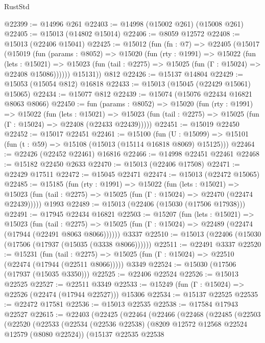 \begin{lexlean}{RustStd}
\begin{coremodule}
@22399 := @14996 @261
@22403 := @14998 (@15002 @261) (@15008 @261)
@22405 := @15013 (@14802 @15014)
@22406 := @8059 @12572
@22408 := @15013 (@22406 @15041)
@22425 := @15012
    (fun (fn : @7) =>
    @22405
      (@15017
        (@15019
          (fun (params : @8052) =>
          @15020
            (fun (rty : @1991) =>
            @15022
              (fun (lets : @15021) =>
              @15023 (fun (tail : @2275) => @15025 (fun (Γ : @15024) => @22408 @15086))))))
        @15131))
    @812
@22426 := @15137 @14804
@22429 := @15053 (@15054 @812) @16818
@22433 := @15013 (@15045 (@22429 @15061) @15065)
@22434 := @15077 @812
@22439 := @15074 (@15076 @22434 @16821 @8063 @8066)
@22450 := fun (params : @8052) =>
  @15020
    (fun (rty : @1991) =>
    @15022
      (fun (lets : @15021) =>
      @15023 (fun (tail : @2275) => @15025 (fun (Γ : @15024) => @22408 (@22433 @22439)))))
@22451 := @15019 @22450
@22452 := @15017 @22451
@22461 := @15100
    (fun (U : @15099) => @15101 (fun (t : @59) => @15108 (@15013 (@15114 @16818 @8069) @15125)))
@22464 := @22426 (@22452 @22461) @16816
@22466 := @14998 @22451 @22461
@22468 := @15182 @22450 @2633
@22470 := @15013 (@22406 @17508)
@22471 := @22429 @17511
@22472 := @15045 @22471
@22474 := @15013 (@22472 @15065)
@22485 := @15185
    (fun (rty : @1991) =>
    @15022
      (fun (lets : @15021) =>
      @15023 (fun (tail : @2275) => @15025 (fun (Γ : @15024) => @22470 (@22474 @22439)))))
    @1993
@22489 := @15013 (@22406 (@15030 (@17506 @17938)))
@22491 := @17945 @22434 @16821
@22503 := @15207
    (fun (lets : @15021) =>
    @15023
      (fun (tail : @2275) =>
      @15025 (fun (Γ : @15024) => @22489 (@22474 (@17944 (@22491 @8063 @8066))))))
    @3337
@22510 := @15013 (@22406 (@15030 (@17506 (@17937 (@15035 (@3338 @8066))))))
@22511 := @22491 @3337
@22520 := @15231
    (fun (tail : @2275) => @15025 (fun (Γ : @15024) => @22510 (@22474 (@17944 (@22511 @8066)))))
    @3349
@22524 := @15030 (@17506 (@17937 (@15035 @3350)))
@22525 := @22406 @22524
@22526 := @15013 @22525
@22527 := @22511 @3349
@22533 := @15249 (fun (Γ : @15024) => @22526 (@22474 (@17944 @22527))) @15306
@22534 := @15137 @22525
@22535 := @22472 @17581
@22536 := @15013 @22535
@22538 := @17584 @17943 @22527
@22615 := @22403
    (@22425
      (@22464
        (@22466
          (@22468
            (@22485
              (@22503
                (@22520
                  (@22533
                    (@22534
                      (@22536 @22538)
                      (@8209 @12572 @12568 @22524 @12579 (@8080 @22524))
                      (@15137
                        @22535
                        @22538

\end{coremodule}
\end{lexlean}
